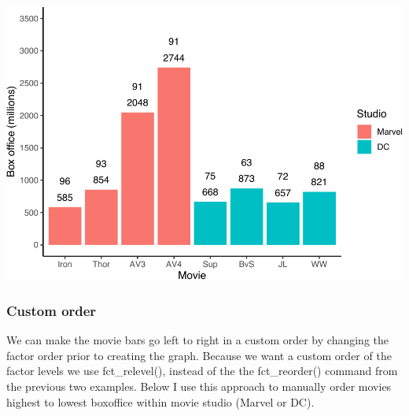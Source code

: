 \documentclass[
]{krantz}
\makeatletter
\newenvironment{Shaded}{\begin{snugshade}}{\end{snugshade}}
\newcommand{\DataTypeTok}[1]{\textcolor[rgb]{0.27,0.27,0.27}{#1}}
\newcommand{\KeywordTok}[1]{\textcolor[rgb]{0.27,0.27,0.27}{\textbf{#1}}}
\newcommand{\NormalTok}[1]{#1}
\newcommand{\OperatorTok}[1]{\textcolor[rgb]{0.43,0.43,0.43}{\textbf{#1}}}
\newcommand{\StringTok}[1]{\textcolor[rgb]{0.5,0.5,0.5}{#1}}
\newenvironment{kframe}{%
\medskip{}
\setlength{\fboxsep}{.8em}
 \def\at@end@of@kframe{}%
 \ifinner\ifhmode%
  \def\at@end@of@kframe{\end{minipage}}%
  \begin{minipage}{\columnwidth}%
 \fi\fi%
 \def\FrameCommand##1{\hskip\@totalleftmargin \hskip-\fboxsep
 \colorbox{shadecolor}{##1}\hskip-\fboxsep
     \hskip-\linewidth \hskip-\@totalleftmargin \hskip\columnwidth}%
 \MakeFramed {\advance\hsize-\width
   \@totalleftmargin\z@ \linewidth\hsize
   \@setminipage}}%
 {\par\unskip\endMakeFramed%
 \at@end@of@kframe}
\renewenvironment{Shaded}{\begin{kframe}}{\end{kframe}}
\makeatother
\begin{document}
\includegraphics[width=0.65\linewidth]{bookdown_files/figure-latex/unnamed-chunk-273-1}

\hypertarget{custom-order}{%
\subsubsection{Custom order}\label{custom-order}}

We can make the movie bars go left to right in a custom order by changing the factor order prior to creating the graph. Because we want a custom order of the factor levels we use fct\_relevel(), instead of the the fct\_reorder() command from the previous two examples. Below I use this approach to manually order movies highest to lowest boxoffice within movie studio (Marvel or DC).

\begin{Shaded}
\end{Shaded}
\end{document}
